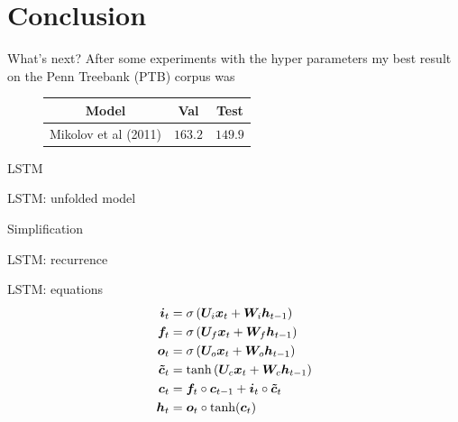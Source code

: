 \documentclass[10pt]{beamer}
\begin{document}
\section{Conclusion}

\begin{frame}{What's next?}
After some experiments with the hyper parameters my best result on the \alert{Penn Treebank (PTB)} corpus was

\vspace{0.5cm}

\begin{figure}
\begin{center}
\begin{tabular}{|c|c|c|}
\hline
\cellcolor{blue!60}Model & \cellcolor{blue!60}Val & \cellcolor{blue!60}Test  \\ \hline
Mikolov et al (2011)\cite{Mikolov11} & $163.2$  & $149.9$ \\ \hline
\end{tabular}
\end{center}
\end{figure}
\end{frame}


\begin{frame}{LSTM}

\end{frame}


\begin{frame}{LSTM: unfolded model}

\end{frame}


\begin{frame}{Simplification}

\end{frame}


\begin{frame}{LSTM: recurrence}

\end{frame}


\begin{frame}{LSTM: equations}
\LARGE{
\begin{align*}
\bm{i}_t &= \sigma \left ( \bm{U}_i \bm{x}_t + \bm{W}_i \bm{h}_{t-1} \right ) \\
\bm{f}_t &= \sigma \left ( \bm{U}_f \bm{x}_t + \bm{W}_f \bm{h}_{t-1} \right ) \\
\bm{o}_t &= \sigma \left ( \bm{U}_o \bm{x}_t + \bm{W}_o \bm{h}_{t-1} \right ) \\
\bm{\tilde{c}}_t &= \textnormal{tanh} \left ( \bm{U}_c \bm{x}_t + \bm{W}_c \bm{h}_{t-1} \right ) \\
\bm{c}_t &= \bm{f}_t \circ \bm{c}_{t-1} + \bm{i}_t \circ \bm{\tilde{c}}_t \\
\bm{h}_t &= \bm{o}_t \circ \textnormal{tanh}(\bm{c}_t)
\end{align*}}
\end{frame}
\end{document}

